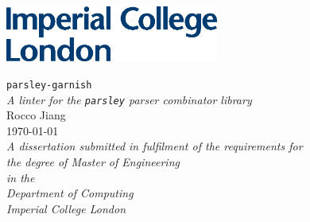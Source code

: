 \documentclass[a4paper, 10pt]{report}
\providecommand{\chaptertitle}{}
\newcommand{\ourchapterstar}[1]{\pagebreak\chapter*{#1}\renewcommand{\chaptertitle}{}}
\newcommand{\authorname}{Rocco Jiang}
\newcommand{\maintitle}{\texttt{parsley-garnish}}
\newcommand{\mainsubtitle}{\emph{A linter for the \texttt{parsley} parser combinator library}}
\newcommand{\TODO}[1]{{\color{DarkRed}#1}}
\begin{document}

\hypersetup{pageanchor=false}
\begin{titlepage}
    \vspace*{-13.5mm}\hspace{-30.6mm}\hspace{17.5mm}\includegraphics[width=7cm]{assets/logo.eps}
    \vspace*{\fill}
    \begin{center}
      {\Huge{\maintitle}}\\[0.4cm]
      {\Large{\mainsubtitle}}\\[1.6cm]
      {\Large{\authorname}}\\[0.2cm]
      {\today}\\[4.0cm]
      \vspace*{\fill}
      {\emph{A dissertation submitted in fulfilment of the requirements for\\ the degree of Master of Engineering}}\\[0.3cm]
      {\emph{in the}}\\[0.4cm]
      {\emph{Department of Computing}}\\
      {\emph{Imperial College London}}\\
    \end{center}
\end{titlepage}

\clearpage %
\setcounter{page}{1}
\setcounter{tocdepth}{2}
\hypersetup{pageanchor=true}

%


\pagebreak
%

\tableofcontents

\pagebreak
{}

%
%
%
%
%

\pagebreak
{}
\renewcommand{\chaptertitle}{Bibliography}
\printbibliography[heading=bibintoc]

\pagebreak
\renewcommand{\chaptertitle}{Appendices}
\appendix
%
\end{document}
